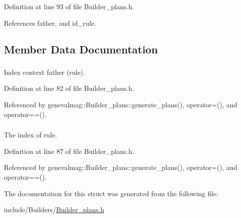 Definition at line 93 of file Builder\_\-plans.h.



References father, and id\_\-rule.



\subsection{Member Data Documentation}
\hypertarget{structgenevalmag_1_1k__w_aef2a6d852e6beedc2247a9fc62033313}{
\subsubsection[{father}]{}}
\label{structgenevalmag_1_1k__w_aef2a6d852e6beedc2247a9fc62033313}


Index context father (rule). 



Definition at line 82 of file Builder\_\-plans.h.



Referenced by genevalmag::Builder\_\-plans::generate\_\-plans(), operator=(), and operator==().

\hypertarget{structgenevalmag_1_1k__w_ab31e8aba428c97c3717c5860509eb3cc}{
\subsubsection[{id\_\-rule}]{}}
\label{structgenevalmag_1_1k__w_ab31e8aba428c97c3717c5860509eb3cc}


The index of rule. 



Definition at line 87 of file Builder\_\-plans.h.



Referenced by genevalmag::Builder\_\-plans::generate\_\-plans(), operator=(), and operator==().



The documentation for this struct was generated from the following file:\begin{DoxyCompactItemize}
\item 
include/Builders/\hyperlink{Builder__plans_8h}{Builder\_\-plans.h}\end{DoxyCompactItemize}

